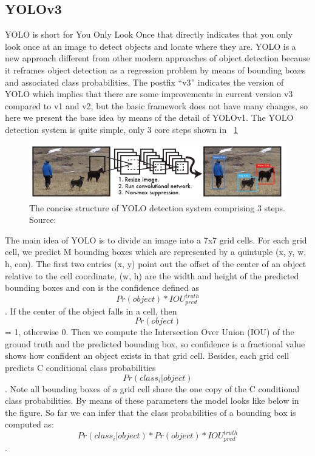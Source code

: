 \documentclass[runningheads]{llncs}
\begin{document}
\subsection{YOLOv3}
YOLO is short for You Only Look Once that directly indicates that you only look once at an image to detect objects and locate where they are. YOLO is a new approach different from other modern approaches of object detection because it reframes object detection as a regression problem by means of bounding boxes and associated class probabilities. The postfix “v3” indicates the version of YOLO which implies that there are some improvements in current version v3 compared to v1 and v2, but the basic framework does not have many changes, so here we present the base idea by means of the detail of YOLOv1. The YOLO detection system is quite simple, only 3 core steps shown in ~\ref{fig4}
\begin{figure}
\includegraphics[width=\textwidth]{figs/YOLO_System.png}
\caption{The concise structure of YOLO detection system comprising 3 steps. Source: ~\cite{ref_yolov1}} \label{fig4}
\end{figure}

The main idea of YOLO is to divide an image into a 7x7 grid cells. For each grid cell, we predict M bounding boxes which are represented by a quintuple (x, y, w, h, con). The first two entries (x, y) point out the offset of the center of an object relative to the cell coordinate, (w, h) are the width and height of the predicted bounding boxes and con is the confidence defined as $$Pr(object) * IOU_{pred}^{truth}$$. If the center of the object falls in a cell, then $$Pr(object)$$ = 1, otherwise 0. Then we compute the Intersection Over Union (IOU) of the ground truth and the predicted bounding box, so confidence is a fractional value shows how confident an object exists in that grid cell. Besides, each grid cell predicts C conditional class probabilities $$Pr(class_i|object)$$. Note all bounding boxes of a grid cell share the one copy of the C conditional class probabilities. By means of these parameters the model looks like below in the figure. So far we can infer that the class probabilities of a bounding box is computed as: $$Pr(class_i|object) * Pr(object) * IOU_{pred}^{truth}$$.
\end{document}

